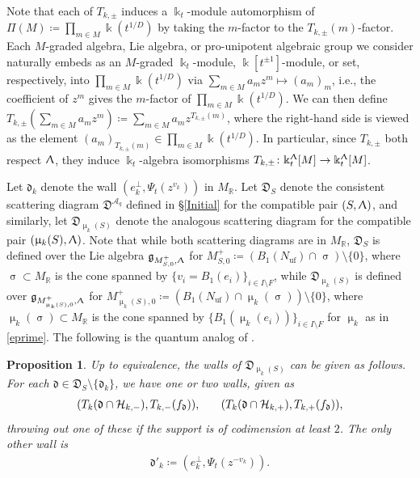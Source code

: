 \documentclass{amsart}
\DeclareMathOperator{\uf}{uf}
\let\bb=\mathbb
\let\rar=\rightarrow
\let\f=\mathfrak
\let\s=\mathcal
\newcommand {\kk} {\Bbbk}
\renewcommand{\sigma}{\upsigma}
\renewcommand{\Lambda}{\Uplambda}
\renewcommand{\mu}{\upmu}
\theoremstyle{plain}%
\newtheorem{prop}[thm]{Proposition}
\theoremstyle{definition}
\theoremstyle{remark}
\begin{document}
Note that each of $T_{k,\pm}$ induces a $\kk_t$-module automorphism of $\Pi(M)\coloneqq \prod_{m\in M} \kk(t^{1/D})$  
by taking the $m$-factor to the $T_{k,\pm}(m)$-factor.  Each $M$-graded algebra, Lie algebra, or pro-unipotent algebraic group we consider naturally embeds as an $M$-graded $\kk_t$-module, $\kk[t^{\pm 1}]$-module, or set, respectively, into $\prod_{m\in M} \kk(t^{1/D})$ via $\sum_{m\in M} a_mz^m \mapsto (a_m)_m$,  i.e., the coefficient of $z^m$ gives the $m$-factor of $\prod_{m\in M} \kk(t^{1/D})$.  We can then define $T_{k,\pm}(\sum_{m\in M} a_mz^m)\coloneqq \sum_{m\in M} a_mz^{T_{k,\pm}(m)}$, where the right-hand side is viewed as the element $(a_m)_{T_{k,\pm}(m)}\in \prod_{m\in M} \kk(t^{1/D})$.  In particular, since $T_{k,\pm}$ both respect $\Lambda$, they induce $\kk_t$-algebra isomorphisms $T_{k,\pm}\colon \kk_t^{\Lambda}[M]\rar \kk_t^{\Lambda}[M]$.






Let $\f{d}_k$ denote the wall $(e_k^{\perp},\Psi_t(z^{v_k}))$ in $M_{\bb{R}}$.   
 Let $\f{D}_S$ denote the consistent scattering diagram $\f{D}^{\s{A}_{q}}$ defined in \S\ref{Initial} for the compatible pair $(S,\Lambda)$, and similarly, let $\f{D}_{\mu_k(S)}$ denote the analogous scattering diagram for the compatible pair $(\mu_k(S),\Lambda)$.  Note that while both scattering diagrams are in $M_{\bb{R}}$, $\f{D}_S$ is defined over the Lie algebra $\f{g}_{M_{S,0}^+,\Lambda}$ for $M_{S,0}^+\coloneqq (B_1(N_{\uf})\cap \sigma)\setminus\{0\}$, where $\sigma\subset M_{\bb{R}}$ is the cone spanned by $\{v_i=B_1(e_i)\}_{i\in I\setminus F}$, while $\f{D}_{\mu_k(S)}$ is defined over $\f{g}_{M_{\mu_k(S),0}^+,\Lambda}$ for $M_{\mu_k(S),0}^{+}\coloneqq (B_1(N_{\uf})\cap \mu_k(\sigma))\setminus \{0\}$, 
 where $\mu_k(\sigma)\subset M_{\bb{R}}$ is the cone spanned by $\{B_1(\mu_k(e_i))\}_{i\in I\setminus F}$ for $\mu_k$ as in \eqref{eprime}.  The following is the quantum analog of \cite[Thm. 1.24]{GHKK}.

\begin{prop}\label{mut-inv}
Up to equivalence, the walls of $\f{D}_{\mu_k(S)}$ can be given as follows.  For each $\f{d}\in \f{D}_{S}\setminus \{\f{d}_k\}$, we have one or two walls, given as
\begin{align*}
    (T_k(\f{d}\cap \s{H}_{k,-}),T_{k,-}(f_{\f{d}})), \hspace{.25 in} (T_k(\f{d}\cap \s{H}_{k,+}),T_{k,+}(f_{\f{d}})),
\end{align*}
throwing out one of these if the support is of codimension at least $2$.  The only other wall is 
\begin{align*}
    \f{d}'_k\coloneqq (e_k^{\perp},\Psi_t(z^{-v_k})).
\end{align*}
\end{prop}
\end{document}
